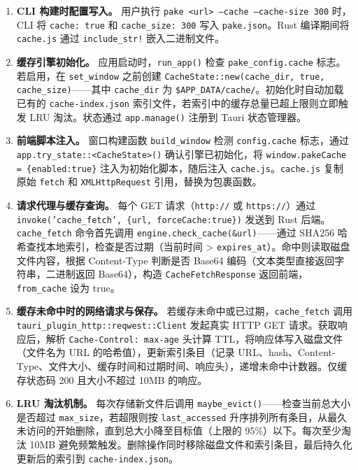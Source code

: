 \documentclass[12pt,a4paper]{ctexart}
\begin{document}
\begin{sloppypar}
\begin{enumerate}[label=(\arabic*)]
  \item \textbf{CLI 构建时配置写入。}
    用户执行 \texttt{pake <url> --cache --cache-size 300} 时，CLI 将 \texttt{cache: true} 和 \texttt{cache\_size: 300} 写入 \texttt{pake.json}。Rust 编译期间将 \texttt{cache.js} 通过 \texttt{include\_str!} 嵌入二进制文件。

  \item \textbf{缓存引擎初始化。}
    应用启动时，\texttt{run\_app()} 检查 \texttt{pake\_config.cache} 标志。若启用，在 \texttt{set\_window} 之前创建 \texttt{CacheState::new(cache\_dir, true, cache\_size)}——其中 \texttt{cache\_dir} 为 \texttt{\$APP\_DATA/cache/}。初始化时自动加载已有的 \texttt{cache-index.json} 索引文件，若索引中的缓存总量已超上限则立即触发 LRU 淘汰。状态通过 \texttt{app.manage()} 注册到 Tauri 状态管理器。

  \item \textbf{前端脚本注入。}
    窗口构建函数 \texttt{build\_window} 检测 \texttt{config.cache} 标志，通过 \texttt{app.try\_state::<CacheState>()} 确认引擎已初始化，将 \texttt{window.pakeCache = \{enabled:true\}} 注入为初始化脚本，随后注入 \texttt{cache.js}。\texttt{cache.js} 复制原始 \texttt{fetch} 和 \texttt{XMLHttpRequest} 引用，替换为包裹函数。

  \item \textbf{请求代理与缓存查询。}
    每个 GET 请求（\texttt{http://} 或 \texttt{https://}）通过 \texttt{invoke('cache\_fetch', \{url, forceCache:true\})} 发送到 Rust 后端。\texttt{cache\_fetch} 命令首先调用 \texttt{engine.check\_cache(\&url)}——通过 SHA256 哈希查找本地索引，检查是否过期（当前时间 > \texttt{expires\_at}）。命中则读取磁盘文件内容，根据 Content-Type 判断是否 Base64 编码（文本类型直接返回字符串，二进制返回 Base64），构造 \texttt{CacheFetchResponse} 返回前端，\texttt{from\_cache} 设为 true。

  \item \textbf{缓存未命中时的网络请求与保存。}
    若缓存未命中或已过期，\texttt{cache\_fetch} 调用 \texttt{tauri\_plugin\_http::reqwest::Client} 发起真实 HTTP GET 请求。获取响应后，解析 \texttt{Cache-Control: max-age} 头计算 TTL，将响应体写入磁盘文件（文件名为 URL 的哈希值），更新索引条目（记录 URL、hash、Content-Type、文件大小、缓存时间和过期时间、响应头），递增未命中计数器。仅缓存状态码 200 且大小不超过 10MB 的响应。

  \item \textbf{LRU 淘汰机制。}
    每次存储新文件后调用 \texttt{maybe\_evict()}——检查当前总大小是否超过 \texttt{max\_size}，若超限则按 \texttt{last\_accessed} 升序排列所有条目，从最久未访问的开始删除，直到总大小降至目标值（上限的 95\%）以下。每次至少淘汰 10MB 避免频繁触发。删除操作同时移除磁盘文件和索引条目，最后持久化更新后的索引到 \texttt{cache-index.json}。


\end{enumerate}
\end{sloppypar}
\end{document}
